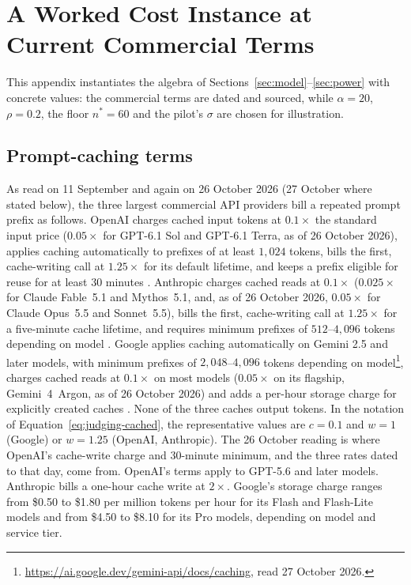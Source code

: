 \documentclass[11pt]{article}
\newcommand{\sectionbreak}{\par\ifdim\pagetotal<5.5\baselineskip\relax\else\clearpage\fi}
\begin{document}
\sectionbreak
\section{A Worked Cost Instance at Current Commercial Terms}
\label{app:worked}

This appendix instantiates the algebra of Sections~\ref{sec:model}--\ref{sec:power} with
concrete values: the commercial terms are dated and sourced, while $\alpha = 20$, $\rho = 0.2$, the floor $n^* = 60$ and the pilot's $\sigma$ are chosen for illustration.

\subsection{Prompt-caching terms}

As read on 11 September and again on 26 October 2026 (27 October where stated below), the three largest commercial API providers bill a
repeated prompt prefix as follows. OpenAI charges cached input tokens at $0.1\times$ the
standard input price ($0.05\times$ for GPT-6.1 Sol and GPT-6.1 Terra, as of 26 October 2026), applies caching automatically to prefixes of at least $1{,}024$
tokens, bills the first, cache-writing call at $1.25\times$ for its default lifetime, and keeps a prefix eligible for reuse for at least 30 minutes
\citep{openai2026caching}. Anthropic charges cached reads at $0.1\times$ ($0.025\times$
for Claude Fable~5.1 and Mythos~5.1, and, as of 26 October 2026, $0.05\times$ for Claude Opus~5.5 and Sonnet~5.5), bills the first, cache-writing call at $1.25\times$ for a
five-minute cache lifetime, and requires minimum prefixes of $512$--$4{,}096$ tokens
depending on model \citep{anthropic2026caching}. Google applies caching automatically on Gemini 2.5 and later models, with minimum prefixes of $2{,}048$--$4{,}096$ tokens depending on model\footnote{\url{https://ai.google.dev/gemini-api/docs/caching}, read 27 October 2026.}, charges cached reads at
$0.1\times$ on most models ($0.05\times$ on its flagship, Gemini~4~Argon, as of 26 October 2026) and adds a per-hour storage charge for explicitly created caches
\citep{google2026pricing}. None of the three caches output tokens. In the notation of
Equation~\ref{eq:judging-cached}, the representative values are $c = 0.1$ and $w = 1$
(Google) or $w = 1.25$ (OpenAI, Anthropic). The 26 October reading is where OpenAI's cache-write charge and 30-minute minimum, and the three rates dated to that day, come from. OpenAI's terms apply to GPT-5.6 and later models. Anthropic bills a one-hour
cache write at $2\times$. Google's storage charge ranges from \$0.50 to \$1.80 per million tokens per hour for its Flash and Flash-Lite models and from \$4.50 to \$8.10 for its Pro models,
depending on model and service tier.
\end{document}
